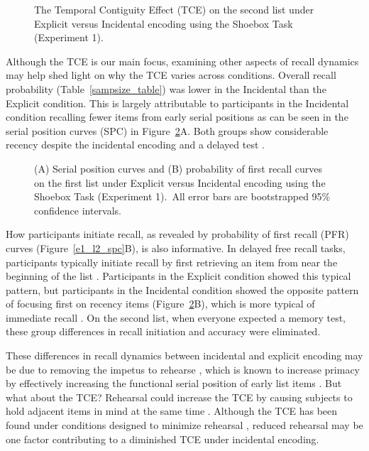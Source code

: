 \documentclass[man,natbib,floatsintext]{apa6} %
\begin{document}
\begin{figure}
\caption{The Temporal Contiguity Effect (TCE) on the second list under Explicit versus Incidental encoding using the Shoebox Task (Experiment 1).\paneltext}
\label{e1_l2_crp}
\end{figure}

Although the TCE is our main focus, examining other aspects of recall dynamics may help shed light on why the TCE varies across conditions. Overall recall probability (Table~\ref{sampsize_table}) was lower in the Incidental than the Explicit condition. This is largely attributable to participants in the Incidental condition recalling fewer items from early serial positions as can be seen in the serial position curves (SPC) in Figure~\ref{e1_l1_spc}A. Both groups show considerable recency despite the incidental encoding and a delayed test \citep[for a similar findings, see][]{MarsWerd72,Neat93,GlenEtal80}.

\newcommand\spcpaneltext{~All error bars are bootstrapped 95\% confidence intervals.}
\begin{figure}
\caption{(A) Serial position curves and (B) probability of first recall curves on the first list under Explicit versus Incidental encoding using the Shoebox Task (Experiment 1).\spcpaneltext}
\label{e1_l1_spc}
\end{figure}

How participants initiate recall, as revealed by probability of first recall (PFR) curves (Figure~\ref{e1_l2_spc}B), is also informative. In delayed free recall tasks, participants typically initiate recall by first retrieving an item from near the beginning of the list \citep[i.e., they focus first on primacy items;][]{HowaKaha99}. Participants in the Explicit condition showed this typical pattern, but participants in the Incidental condition showed the opposite pattern of focusing first on recency items (Figure~\ref{e1_l1_spc}B), which is more typical of immediate recall \citep{Hoga75}. On the second list, when everyone expected a memory test, these group differences in recall initiation and accuracy were eliminated.

These differences in recall dynamics between incidental and explicit encoding may be due to removing the impetus to rehearse \citep{MarsWerd72,Neat93,GlenEtal80}, which is known to increase primacy by effectively increasing the  functional serial position of early list items \citep{Rund71,BrodMurd77,TanWard00}. But what about the TCE? Rehearsal could increase the TCE by causing subjects to hold adjacent items in mind at the same time \citep{Hint16}. Although the TCE has been found under conditions designed to minimize rehearsal \citep{HowaKaha99}, reduced rehearsal may be one factor contributing to a diminished TCE under incidental encoding.
\end{document}
